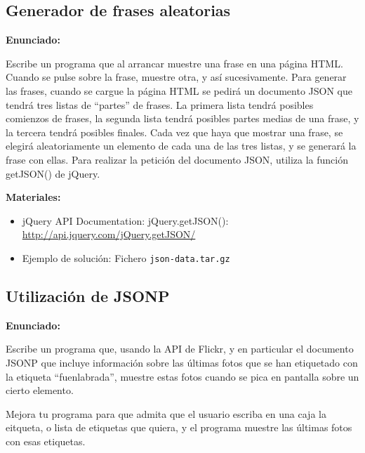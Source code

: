 \subsection{Generador de frases aleatorias}
\label{subsec:eje-jquery-frases-aleatorias}

\textbf{Enunciado:}

Escribe un programa que al arrancar muestre una frase en una página HTML. Cuando se pulse sobre la frase, muestre otra, y así sucesivamente. Para generar las frases, cuando se cargue la página HTML se pedirá un documento JSON que tendrá tres listas de ``partes'' de frases. La primera lista tendrá posibles comienzos de frases, la segunda lista tendrá posibles partes medias de una frase, y la tercera tendrá posibles finales. Cada vez que haya que mostrar una frase, se elegirá aleatoriamente un elemento de cada una de las tres listas, y se generará la frase con ellas. Para realizar la petición del documento JSON, utiliza la función getJSON() de jQuery.

\textbf{Materiales:}

\begin{itemize}
\item jQuery API Documentation: jQuery.getJSON(): \\
  \url{http://api.jquery.com/jQuery.getJSON/}
\item Ejemplo de solución: Fichero \verb|json-data.tar.gz|
\end{itemize}

\subsection{Utilización de JSONP}
\label{subsec:eje-jquery-jsonp}

\textbf{Enunciado:}

Escribe un programa que, usando la API de Flickr, y en particular el documento JSONP que incluye información sobre las últimas fotos que se han etiquetado con la etiqueta ``fuenlabrada'', muestre estas fotos cuando se pica en pantalla sobre un cierto elemento.

Mejora tu programa para que admita que el usuario escriba en una caja la eitqueta, o lista de etiquetas que quiera, y el programa muestre las últimas fotos con esas etiquetas.

